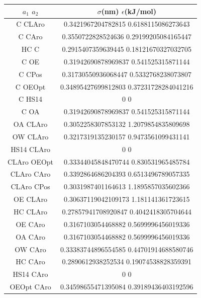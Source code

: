 \begin{table}[!h]
    \centering
    \begin{tabular}{|c|c|}
    \hline
        $a_1$ $a_2$ & $\sigma$(nm) $\epsilon$(kJ/mol) \\
        \hline
        C    CLAro      &     0.3421967204782815 0.6188115086273643\\
        C     CAro      &     0.3550722828524636 0.29199205084165447\\
        HC	C	        &     0.2915407359639445 0.18121670327032705\\
        C	OE	        &     0.31942690878969837 0.541525315871144\\
        C     CPos      &     0.31730550936068447 0.5332768238073807\\
        C    OEOpt      &     0.34895427699812803 0.37231728284041216\\
        C     HS14      &     0                   0\\
        C	OA	        &     0.31942690878969837 0.541525315871144\\
        OA    CLAro     &     0.3052258307853132 1.2079854835809698\\
        OW    CLAro     &     0.3217319135230157 0.9473561099431141\\
        HS14    CLAro   &     0                   0\\
        CLAro    OEOpt  &     0.33344045848470744 0.830531965485784\\
        CLAro     CAro  &     0.3392864686204393 0.6513496789057335\\
        CLAro     CPos  &     0.3031987401164613 1.1895857035602366\\
        OE    CLAro     &     0.30637119042109173 1.181141361723615\\
        HC    CLAro     &     0.27857941708920847 0.4042418305704644\\
        OE     CAro     &     0.3167103054468882 0.5699996456019336\\
        OA     CAro     &     0.3167103054468882 0.5699996456019336\\
        OW     CAro     &     0.33383744896554585 0.44701914688580746\\
        HC     CAro     &     0.2890612938252534 0.19074538828359391\\
        HS14     CAro   &     0                   0\\
        OEOpt     CAro  &     0.34598655471395084 0.39189436403192596\\

\end{tabular}
\end{table}
